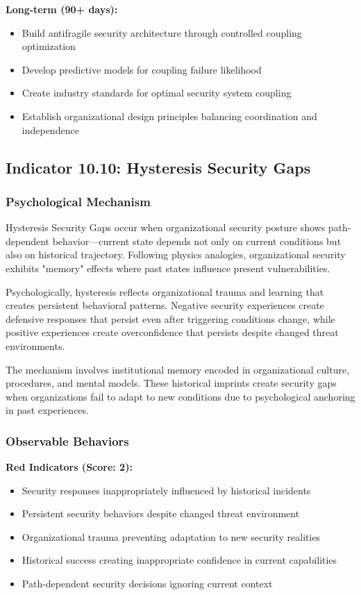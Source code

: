 \documentclass[11pt,a4paper]{article}
\begin{document}
\textbf{Long-term (90+ days):}
\begin{itemize}
\item Build antifragile security architecture through controlled coupling optimization
\item Develop predictive models for coupling failure likelihood
\item Create industry standards for optimal security system coupling
\item Establish organizational design principles balancing coordination and independence
\end{itemize}

\subsection{Indicator 10.10: Hysteresis Security Gaps}

\subsubsection{Psychological Mechanism}

Hysteresis Security Gaps occur when organizational security posture shows path-dependent behavior—current state depends not only on current conditions but also on historical trajectory. Following physics analogies, organizational security exhibits "memory" effects where past states influence present vulnerabilities.

Psychologically, hysteresis reflects organizational trauma and learning that creates persistent behavioral patterns. Negative security experiences create defensive responses that persist even after triggering conditions change, while positive experiences create overconfidence that persists despite changed threat environments.

The mechanism involves institutional memory encoded in organizational culture, procedures, and mental models. These historical imprints create security gaps when organizations fail to adapt to new conditions due to psychological anchoring in past experiences.

\subsubsection{Observable Behaviors}

\textbf{Red Indicators (Score: 2):}
\begin{itemize}
\item Security responses inappropriately influenced by historical incidents
\item Persistent security behaviors despite changed threat environment
\item Organizational trauma preventing adaptation to new security realities
\item Historical success creating inappropriate confidence in current capabilities
\item Path-dependent security decisions ignoring current context
\end{itemize}
\end{document}
